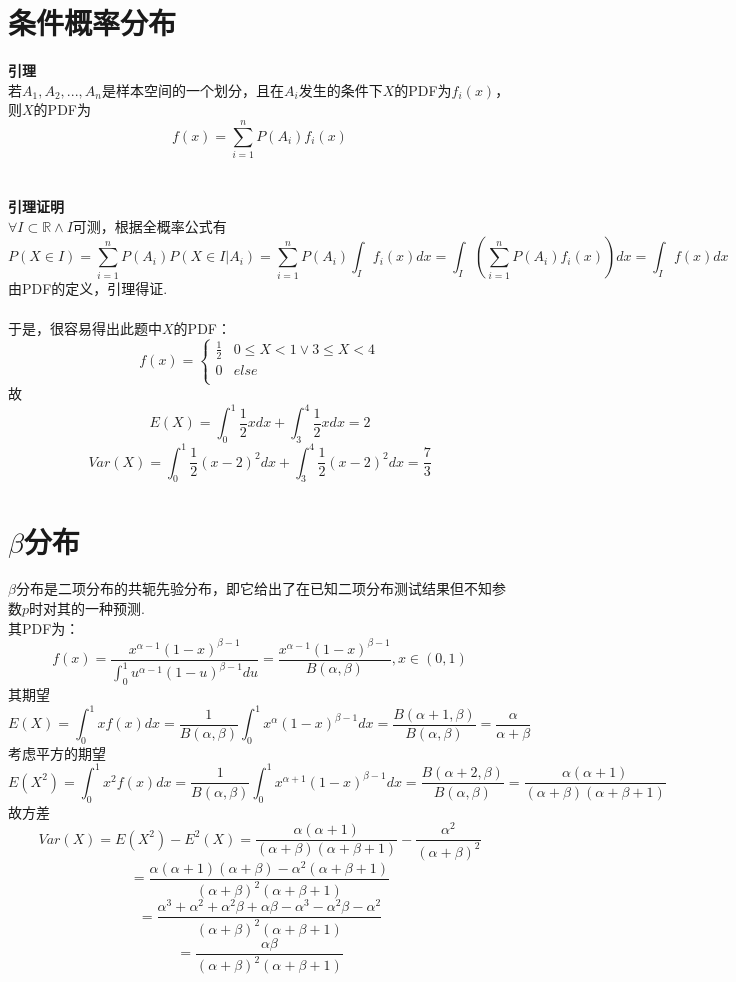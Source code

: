 \documentclass{article}
\begin{document}
\begin{CJK}{UTF8}{gbsn}
\section{条件概率分布}
\textbf{引理}
\\若$A_{1},A_{2},...,A_{n}$是样本空间的一个划分，且在$A_{i}$发生的条件下$X$的PDF为$f_{i}(x)$，则$X$的PDF为
$$ f(x)=\sum\limits_{i=1}^{n}P(A_{i})f_{i}(x)$$
\\\\
\textbf{引理证明}\\
$\forall I\subset\mathbb{R}\land I$可测，根据全概率公式有
$$ P(X\in I)=\sum\limits_{i=1}^{n}P(A_{i})P(X\in I|A_{i})=\sum\limits_{i=1}^{n}P(A_{i})\int_{I}f_{i}(x)dx=\int_{I}(\sum\limits_{i=1}^{n}P(A_{i})f_{i}(x))dx=\int_{I}f(x)dx$$
由PDF的定义，引理得证.
\\\\
于是，很容易得出此题中$X$的PDF：
\begin{equation}
    f(x)=\left\{
    \begin{array}{cl}
    \frac{1}{2} & 0\leq X<1\lor 3\leq X<4\\
    0 & else\\
    \end{array}\right.
\end{equation}
故
$$E(X)=\int_{0}^{1}\frac{1}{2}xdx+\int_{3}^{4}\frac{1}{2}xdx=2$$
$$Var(X)=\int_{0}^{1}\frac{1}{2}(x-2)^{2}dx+\int_{3}^{4}\frac{1}{2}(x-2)^{2}dx=\frac{7}{3}$$
\section{$\beta$分布}
$\beta$分布是二项分布的共轭先验分布，即它给出了在已知二项分布测试结果但不知参数$p$时对其的一种预测. \\其PDF为：
$$ f(x)=\frac{x^{\alpha-1}(1-x)^{\beta-1}}{\int_{0}^{1}u^{\alpha-1}(1-u)^{\beta-1}du}=\frac{x^{\alpha-1}(1-x)^{\beta-1}}{B(\alpha,\beta)},x\in(0,1)$$
其期望
$$ E(X)=\int_{0}^{1}xf(x)dx=\frac{1}{B(\alpha,\beta)}\int_{0}^{1}x^{\alpha}(1-x)^{\beta-1}dx=\frac{B(\alpha+1,\beta)}{B(\alpha,\beta)}=\frac{\alpha}{\alpha+\beta} $$
考虑平方的期望
$$ E(X^{2})=\int_{0}^{1}x^{2}f(x)dx=\frac{1}{B(\alpha,\beta)}\int_{0}^{1}x^{\alpha+1}(1-x)^{\beta-1}dx=\frac{B(\alpha+2,\beta)}{B(\alpha,\beta)}=\frac{\alpha(\alpha+1)}{(\alpha+\beta)(\alpha+\beta+1)}$$
故方差
$$ Var(X)=E(X^{2})-E^{2}(X)=\frac{\alpha(\alpha+1)}{(\alpha+\beta)(\alpha+\beta+1)}-\frac{\alpha^{2}}{(\alpha+\beta)^{2}}$$
$$ =\frac{\alpha(\alpha+1)(\alpha+\beta)-\alpha^{2}(\alpha+\beta+1)}{(\alpha+\beta)^{2}(\alpha+\beta+1)}$$
$$ =\frac{\alpha^{3}+\alpha^{2}+\alpha^{2}\beta+\alpha\beta-\alpha^{3}-\alpha^{2}\beta-\alpha^{2}}{(\alpha+\beta)^{2}(\alpha+\beta+1)}$$
$$ =\frac{\alpha\beta}{(\alpha+\beta)^{2}(\alpha+\beta+1)}$$

\end{CJK}
\end{document}
